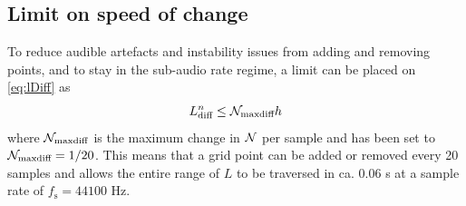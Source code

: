 \subsection{Limit on speed of change}\label{sec:limit}
To reduce audible artefacts and instability issues from adding and removing points, and to stay in the sub-audio rate regime, a limit can be placed on \eqref{eq:lDiff} as
\begin{equation}\label{eq:Nmaxdiff} 
    L_\text{diff}^n \leq \mathcal{N}_\text{maxdiff} h
\end{equation}
where $\mathcal{N}_\text{maxdiff}$ is the maximum change in $\mathcal{N}$ per sample and has been set to $\mathcal{N}_\text{maxdiff} = 1/20$. This means that a grid point can be added or removed every 20 samples and allows the entire range of $L$ to be traversed in ca. 0.06 s at a sample rate of $f_\text{s} = 44100$ Hz.

